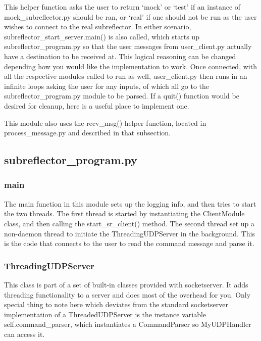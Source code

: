 \documentclass{article}
\begin{document}
This helper function asks the user to return `mock' or `test' if an instance of mock\_subreflector.py should be ran, or `real' if one should not be run as the user wishes to connect to the real subreflector. In either scenario, subreflector\_start\_server.main() is also called, which starts up subreflector\_program.py so that the user messages from user\_client.py actually have a destination to be received at. This logical reasoning can be changed depending how you would like the implementation to work. Once connected, with all the respective modules called to run as well, user\_client.py then runs in an infinite loops asking the user for any inputs, of which all go to the subreflector\_program.py module to be parsed. If a quit() function would be desired for cleanup, here is a useful place to implement one. 

\vspace{10pt}

This module also uses the recv\_msg() helper function, located in process\_message.py and described in that subsection.


\newpage
\subsection{subreflector\_program.py}

\subsubsection*{main}

The main function in this module sets up the logging info, and then tries to start the two threads. The first thread is started by instantiating  the ClientModule class, and then calling the start\_sr\_client() method. The second thread set up a non-daemon thread to initiate the ThreadingUDPServer in the background. This is the code that connects to the user to read the command message and parse it.


\subsubsection{ThreadingUDPServer}

This class is part of a set of built-in classes provided with socketserver. It adds threading functionality to a server and does most of the overhead for you. Only special thing to note here which deviates from the standard socketserver implementation of a ThreadedUDPServer is the instance variable self.command\_parser, which instantiates a CommandParser so MyUDPHandler can access it.
\end{document}
